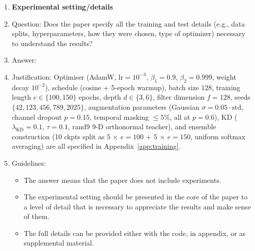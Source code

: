 \begin{enumerate}
\item {\bf Experimental setting/details}
    \item[] Question: Does the paper specify all the training and test details (e.g., data splits, hyperparameters, how they were chosen, type of optimizer) necessary to understand the results?
    \item[] Answer: \answerYes{}
    \item[] Justification: Optimiser (AdamW, $\mathrm{lr}=10^{-3}$, $\beta_1=0.9$, $\beta_2=0.999$, weight decay $10^{-2}$), schedule (cosine + 5-epoch warmup), batch size $128$, training length $e \in \{100, 150\}$ epochs, depth $d \in \{3, 6\}$, filter dimension $f=128$, seeds $\{42, 123, 456, 789, 2025\}$, augmentation parameters (Gaussian $\sigma=0.05\cdot\mathrm{std}$, channel dropout $p=0.15$, temporal masking $\leq 5\%$, all at $p=0.6$), KD ($\lambda_{\mathrm{KD}}=0.1$, $\tau=0.1$, rand9 9-D orthonormal teacher), and ensemble construction (10 ckpts split as 5 $\times$ $e=100$ + 5 $\times$ $e=150$, uniform softmax averaging) are all specified in Appendix~\ref{app:training}.
    \item[] Guidelines:
    \begin{itemize}
        \item The answer \answerNA{} means that the paper does not include experiments.
        \item The experimental setting should be presented in the core of the paper to a level of detail that is necessary to appreciate the results and make sense of them.
        \item The full details can be provided either with the code, in appendix, or as supplemental material.
    \end{itemize}


\end{enumerate}
